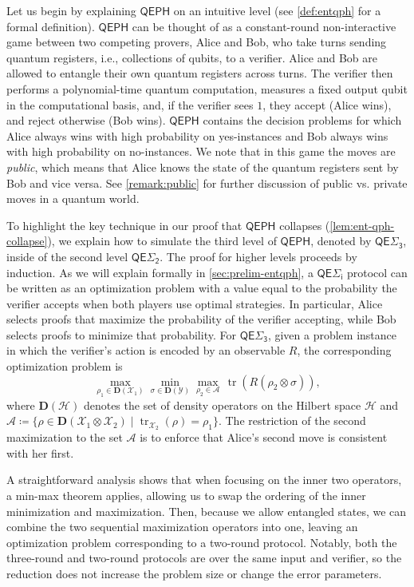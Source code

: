 \documentclass[11pt]{article}
\theoremstyle{definition}
\DeclareMathOperator{\tr}{tr}
\newcommand{\class}[1]{\ensuremath{\mathsf{#1}}\xspace}
\newcommand{\QEPH}{\class{QEPH}}
\newcommand{\entQSigmai}[1][i]{\class{QE\Sigma_{#1}}}
\newcommand{\calA}{\mathcal{A}}
\newcommand{\calH}{\mathcal{H}}
\newcommand{\calX}{\mathcal{X}}
\newcommand{\calY}{\mathcal{Y}}
\begin{document}
Let us begin by explaining $\QEPH$ on an intuitive level (see \cref{def:entqph} for a formal definition). 
$\QEPH$ can be thought of as a constant-round non-interactive game between two competing provers, Alice and Bob, who take turns sending quantum registers, i.e., collections of qubits, to a verifier. Alice and Bob are allowed to entangle their own quantum registers across turns.
The verifier then performs a polynomial-time quantum computation, measures a fixed output qubit in the computational basis, and, if the verifier sees $1$, they accept (Alice wins), and reject otherwise (Bob wins). 
$\QEPH$ contains the decision problems for which Alice always wins with high probability on yes-instances and Bob always wins with high probability on no-instances. 
We note that in this game the moves are \emph{public}, which means that Alice knows the state of the quantum registers sent by Bob and vice versa.
See \cref{remark:public} for further discussion of public vs. private moves in a quantum world.


To highlight the key technique in our proof that $\QEPH$ collapses (\cref{lem:ent-qph-collapse}), we explain how to simulate the third level of $\QEPH$, denoted by $\entQSigmai[3]$, inside of the second level $\entQSigmai[2]$. The proof for higher levels proceeds by induction.
As we will explain formally in \cref{sec:prelim-entqph}, a $\entQSigmai[i]$ protocol can be written as an optimization problem with a value equal to the probability the verifier accepts when both players use optimal strategies.
In particular, Alice selects proofs that maximize the probability of the verifier accepting, while Bob selects proofs to minimize that probability.
For $\entQSigmai[3]$, given a problem instance in which the verifier's action is encoded by an observable $R$, the corresponding optimization problem is
\begin{equation*}
    \max_{\rho_1 \in \mathbf{D}(\calX_1)} \min_{\sigma \in \mathbf{D}(\calY)} \max_{\rho_2 \in \calA}\, \tr\left( R \left( \rho_2 \otimes \sigma\right) \right),  
\end{equation*}
where $\mathbf{D}(\calH)$ denotes the set of density operators on the Hilbert space $\calH$
and $\calA \coloneqq \{ \rho \in \mathbf{D}(\calX_1 \otimes \calX_2) \mid \tr_{\calX_2}(\rho) = \rho_1\}$.
The restriction of the second maximization to the set $\calA$ is 
to enforce that Alice's second move is consistent with her first.

A straightforward analysis shows that when focusing on the inner two operators, a min-max theorem applies, allowing us to swap the ordering of the inner minimization and maximization. Then, because we allow entangled states, we can combine the two sequential maximization operators into one, leaving an optimization problem corresponding to a two-round protocol.
Notably, both the three-round and two-round protocols are over the same input and verifier, so the reduction does not increase the problem size or change the error parameters.
\end{document}
